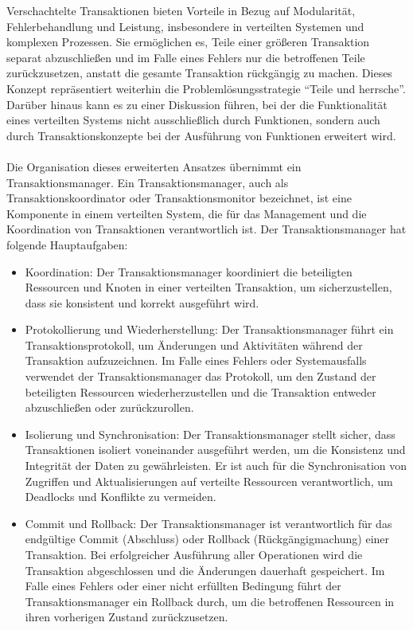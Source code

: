 \documentclass[../vs-script-first-v01.tex]{subfiles}
\begin{document}
Verschachtelte Transaktionen bieten Vorteile in Bezug auf Modularität, Fehlerbehandlung und Leistung, insbesondere in verteilten Systemen und komplexen Prozessen. Sie ermöglichen es, Teile einer größeren Transaktion separat abzuschließen und im Falle eines Fehlers nur die betroffenen Teile zurückzusetzen, anstatt die gesamte Transaktion rückgängig zu machen. Dieses Konzept repräsentiert weiterhin die Problemlösungsstrategie \enquote{Teile und herrsche}. Darüber hinaus kann es zu einer Diskussion führen, bei der die Funktionalität eines verteilten Systems nicht ausschließlich durch Funktionen, sondern auch durch Transaktionskonzepte bei der Ausführung von Funktionen erweitert wird.
\\\\
Die Organisation dieses erweiterten Ansatzes übernimmt ein Transaktionsmanager. Ein Transaktionsmanager, auch als Transaktionskoordinator oder Transaktionsmonitor bezeichnet, ist eine Komponente in einem verteilten System, die für das Management und die Koordination von Transaktionen verantwortlich ist. Der Transaktionsmanager hat folgende Hauptaufgaben:
\begin{itemize}
\item Koordination: Der Transaktionsmanager koordiniert die beteiligten Ressourcen und Knoten in einer verteilten Transaktion, um sicherzustellen, dass sie konsistent und korrekt ausgeführt wird.
\item Protokollierung und Wiederherstellung: Der Transaktionsmanager führt ein Transaktionsprotokoll, um Änderungen und Aktivitäten während der Transaktion aufzuzeichnen. Im Falle eines Fehlers oder Systemausfalls verwendet der Transaktionsmanager das Protokoll, um den Zustand der beteiligten Ressourcen wiederherzustellen und die Transaktion entweder abzuschließen oder zurückzurollen.
\item Isolierung und Synchronisation: Der Transaktionsmanager stellt sicher, dass Transaktionen isoliert voneinander ausgeführt werden, um die Konsistenz und Integrität der Daten zu gewährleisten. Er ist auch für die Synchronisation von Zugriffen und Aktualisierungen auf verteilte Ressourcen verantwortlich, um Deadlocks und Konflikte zu vermeiden.
\item Commit und Rollback: Der Transaktionsmanager ist verantwortlich für das endgültige Commit (Abschluss) oder Rollback (Rückgängigmachung) einer Transaktion. Bei erfolgreicher Ausführung aller Operationen wird die Transaktion abgeschlossen und die Änderungen dauerhaft gespeichert. Im Falle eines Fehlers oder einer nicht erfüllten Bedingung führt der Transaktionsmanager ein Rollback durch, um die betroffenen Ressourcen in ihren vorherigen Zustand zurückzusetzen.
\end{itemize}
\end{document}
